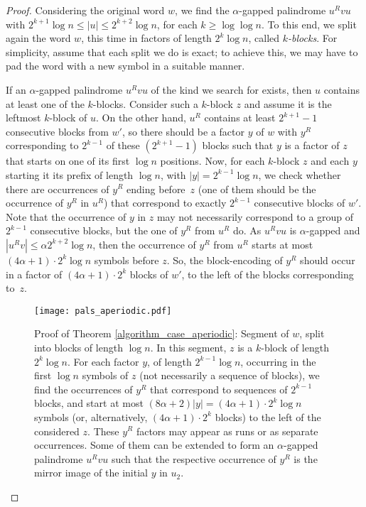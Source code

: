 \documentclass[final]{dmtcs-episciences}
\begin{document}
\begin{proof}
Considering the original word $w$, we find the $\alpha$-gapped palindrome $u^Rvu$ with $2^{k+1} \log n \leq |u| \leq 2^{k+2}\log n$, for each $k\geq \log \log n$. To this end, we split again the word $w$, this time in factors of length $2^k \log n$, called {\em $k$-blocks}. For simplicity, assume that each split we do is exact; to achieve this, we may have to pad the word with a new symbol in a suitable manner. 

If an $\alpha$-gapped palindrome $u^Rvu$ of the kind we search for exists, then $u$ contains at least one of the $k$-blocks. Consider such a $k$-block $z$ and assume it is the leftmost $k$-block of $u$. On the other hand, $u^R$ contains at least $2^{k+1}-1$ consecutive blocks from $w'$, so there should be a factor $y$ of $w$ with $y^R$ corresponding to $2^{k-1}$ of these $(2^{k+1}-1)$ blocks such that $y$ is a factor of $z$ that starts on one of its first $\log n$ positions. Now, for each $k$-block $z$ and each $y$ starting it its prefix of length $\log n$, with $|y|=2^{k-1}\log n$, we check whether there are occurrences of $y^R$ ending before~$z$ (one of them should be the occurrence of $y^R$ in $u^R$) that correspond to exactly $2^{k-1}$ consecutive blocks of $w'$. Note that the occurrence of $y$ in $z$ may not necessarily correspond to a group of $2^{k-1}$ consecutive blocks, but the one of $y^R$ from $u^R$ do. As $u^Rvu$ is $\alpha$-gapped and $|u^Rv|\leq \alpha 2^{k+2}\log n$, then the occurrence of $y^R$ from $u^R$ starts at most $(4\alpha + 1)\cdot 2^{k} \log n$ symbols before $z$. So, the block-encoding of $y^R$ should occur in a factor of  $(4\alpha +1)\cdot 2^k$ blocks of $w'$, to the left of the blocks corresponding to~$z$.


\begin{figure}\begin{center}
\texttt{[image: pals\_aperiodic.pdf]}
\end{center}
\caption{
Proof of Theorem \ref{algorithm_case_aperiodic}: Segment of $w$, split into blocks of length $\log n$. In this segment, $z$ is a $k$-block of length $2^k\log n$. For each factor $y$, of length $2^{k-1}\log n$, occurring in the first $\log n$ symbols of $z$ (not necessarily a sequence of blocks), we find the occurrences of $y^R$ that correspond to sequences of $2^{k-1}$ blocks, and start at most $(8\alpha+2)|y|=(4\alpha+1)\cdot 2^{k}\log n$ symbols (or, alternatively, $(4\alpha +1)\cdot 2^{k}$ blocks) to the left of the considered $z$. These $y^R$ factors may appear as runs or as separate occurrences. Some of them can be extended to form an $\alpha$-gapped palindrome $u^Rvu$ such that the respective occurrence of $y^R$ is the mirror image of the initial $y$ in $u_2$.}
\end{figure}


\end{proof}
\end{document}
